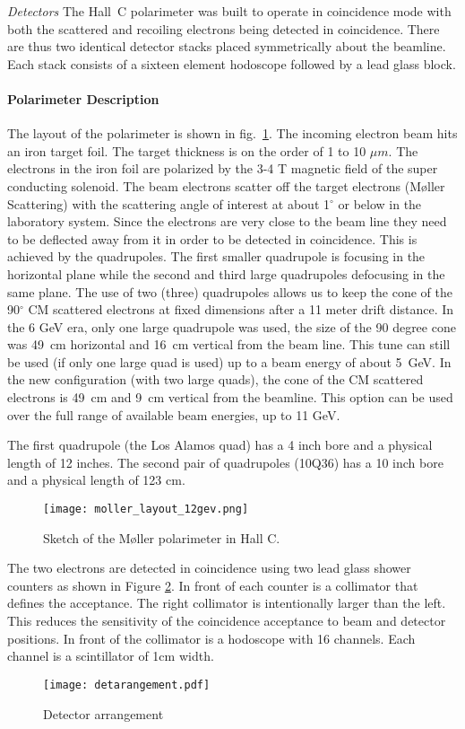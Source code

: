 {{\sl Detectors} The Hall~C polarimeter was built to operate in
coincidence mode with both the scattered and recoiling electrons being
detected in coincidence. There are thus two identical detector stacks
placed symmetrically about the beamline. Each stack consists of a
sixteen element hodoscope followed by a lead glass block.

\paragraph{Polarimeter Description}
The layout of the polarimeter is shown in fig.~\ref{fig:polsketch}.
The incoming electron beam hits an iron target foil. The target
thickness is on the order of 1 to 10 $\mu m$. The electrons in the
iron foil are polarized by the 3-4 T magnetic field of the super
conducting solenoid.  The beam electrons scatter off the target
electrons (M\o ller Scattering) with the scattering angle of interest
at about 1$^{\circ}$ or below in the laboratory system. Since the
electrons are very close to the beam line they need to be deflected
away from it in order to be detected in coincidence. This is achieved
by the quadrupoles. The first smaller quadrupole is focusing in the
horizontal plane while the second and third large quadrupoles
defocusing in the same plane. The use of two (three) quadrupoles
allows us to keep the cone of the 90$^{\circ}$ CM scattered electrons
at fixed dimensions after a 11 meter drift distance.  In the 6 GeV
era, only one large quadrupole was used, the size of the 90 degree
cone was 49~cm horizontal and 16~cm vertical from the beam line. This
tune can still be used (if only one large quad is used) up to a beam
energy of about 5~GeV. In the new configuration (with two large
quads), the cone of the CM scattered electrons is 49~cm and 9~cm
vertical from the beamline. This option can be used over the full
range of available beam energies, up to 11 GeV.

The first quadrupole (the Los Alamos quad) has a 4 inch bore and a
physical length of 12 inches. The second pair of quadrupoles (10Q36)
has a 10 inch bore and a physical length of 123 cm.
\begin{figure}[htp]
\begin{center}
\texttt{[image: moller\_layout\_12gev.png]}
\caption{Sketch of the M\o ller polarimeter in Hall C.\label{fig:polsketch}}
\end{center}
\end{figure}
The two electrons are detected in coincidence using two lead glass
shower counters as shown in Figure \ref{detarr}. In front of each
counter is a collimator that defines the acceptance. The right
collimator is intentionally larger than the left. This reduces the
sensitivity of the coincidence acceptance to beam and detector
positions. In front of the collimator is a hodoscope with 16
channels. Each channel is a scintillator of 1cm width.
\begin{figure}
\texttt{[image: detarangement.pdf]}
\begin{center}
\parbox{10cm}{
\caption{Detector arrangement}\label{detarr}}
\end{center}
\end{figure}

}
